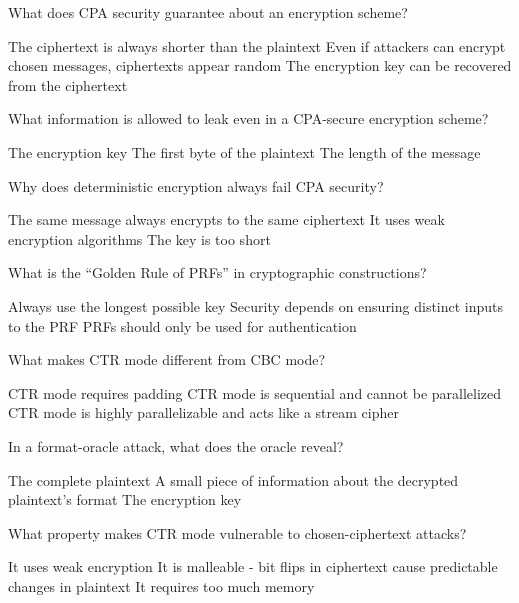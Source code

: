 \documentclass[10pt,a4paper,american]{exam}
\begin{document}
\begin{questions}
	\question What does CPA security guarantee about an encryption scheme?
	\begin{randomizechoices}
		\choice The ciphertext is always shorter than the plaintext
		\CorrectChoice Even if attackers can encrypt chosen messages, ciphertexts appear random
		\choice The encryption key can be recovered from the ciphertext
	\end{randomizechoices}

	\question What information is allowed to leak even in a CPA-secure encryption scheme?
	\begin{randomizechoices}
		\choice The encryption key
		\choice The first byte of the plaintext
		\CorrectChoice The length of the message
	\end{randomizechoices}

	\question Why does deterministic encryption always fail CPA security?
	\begin{randomizechoices}
		\CorrectChoice The same message always encrypts to the same ciphertext
		\choice It uses weak encryption algorithms
		\choice The key is too short
	\end{randomizechoices}

	\question What is the ``Golden Rule of PRFs'' in cryptographic constructions?
	\begin{randomizechoices}
		\choice Always use the longest possible key
		\CorrectChoice Security depends on ensuring distinct inputs to the PRF
		\choice PRFs should only be used for authentication
	\end{randomizechoices}

	\question What makes CTR mode different from CBC mode?
	\begin{randomizechoices}
		\choice CTR mode requires padding
		\choice CTR mode is sequential and cannot be parallelized
		\CorrectChoice CTR mode is highly parallelizable and acts like a stream cipher
	\end{randomizechoices}

	\question In a format-oracle attack, what does the oracle reveal?
	\begin{randomizechoices}
		\choice The complete plaintext
		\CorrectChoice A small piece of information about the decrypted plaintext's format
		\choice The encryption key
	\end{randomizechoices}

	\question What property makes CTR mode vulnerable to chosen-ciphertext attacks?
	\begin{randomizechoices}
		\choice It uses weak encryption
		\CorrectChoice It is malleable - bit flips in ciphertext cause predictable changes in plaintext
		\choice It requires too much memory
	\end{randomizechoices}


\end{questions}
\end{document}
